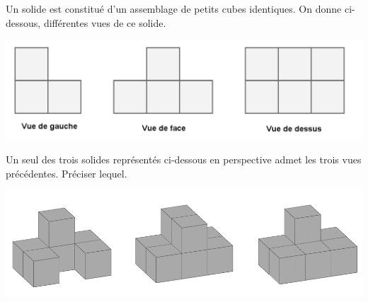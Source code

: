 
Un solide est constitué d’un assemblage de petits cubes identiques. On donne ci-dessous,
différentes vues de ce solide.

\includegraphics[scale=0.35]{RepS-flash1.png} 

Un seul des trois solides représentés ci-dessous en perspective admet les trois vues
précédentes. Préciser lequel.

\includegraphics[scale=0.35]{RepS-flash1b.png}

